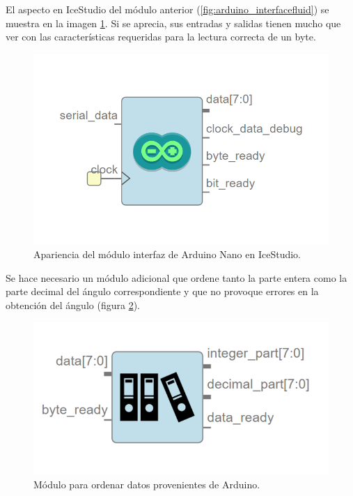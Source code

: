 El aspecto en IceStudio del módulo anterior (\ref{fig:arduino_interfacefluid}) se muestra en la imagen \ref{fig:arduino_interface}. Si se aprecia, sus entradas y salidas tienen mucho que ver con las características requeridas para la lectura correcta de un byte.

\begin{figure}[H]
	\center
	\includegraphics[scale=0.6]{imagenes/Balancing_robot/arduino_interface.PNG}
	\caption{Apariencia del módulo interfaz de Arduino Nano en IceStudio.}
	\label{fig:arduino_interface}
\end{figure}

Se hace necesario un módulo adicional que ordene tanto la parte entera como la parte decimal del ángulo correspondiente y que no provoque errores en la obtención del ángulo (figura \ref{fig:arrange_arduino}). 

\begin{figure}[H]
	\center
	\includegraphics[scale=0.4]{imagenes/Balancing_robot/arrange_arduino.PNG}
	\caption{Módulo para ordenar datos provenientes de Arduino.}
	\label{fig:arrange_arduino}
\end{figure}


